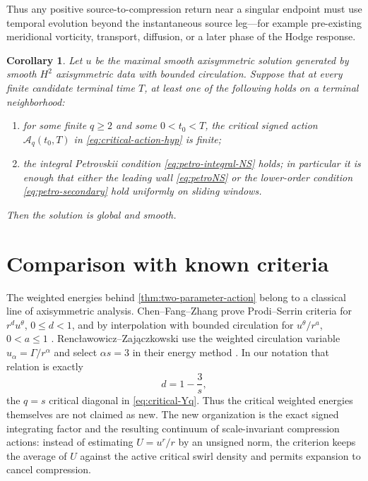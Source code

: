 \documentclass[11pt]{article}
\numberwithin{equation}{section}
\newtheorem{corollary}[corollary]{Corollary}
\theoremstyle{definition}
\begin{document}
Thus any positive source-to-compression return near a singular endpoint must use temporal evolution beyond the instantaneous source leg---for example pre-existing meridional vorticity, transport, diffusion, or a later phase of the Hodge response.

\begin{corollary}\label{cor:conditional-global}
Let $u$ be the maximal smooth axisymmetric solution generated by smooth $H^2$ axisymmetric data with bounded circulation.  Suppose that at every finite candidate terminal time $T$, at least one of the following holds on a terminal neighborhood:
\begin{enumerate}[label=\rm(\alph*)]
\item for some finite $q\ge2$ and some $0<t_0<T$, the critical signed action $\mathcal A_q(t_0,T)$ in \eqref{eq:critical-action-hyp} is finite;
\item the integral Petrovskii condition \eqref{eq:petro-integral-NS} holds; in particular it is enough that either the leading wall \eqref{eq:petroNS} or the lower-order condition \eqref{eq:petro-secondary} hold uniformly on sliding windows.
\end{enumerate}
Then the solution is global and smooth.
\end{corollary}

\section{Comparison with known criteria}

The weighted energies behind \cref{thm:two-parameter-action} belong to a classical line of axisymmetric analysis.  Chen--Fang--Zhang prove Prodi--Serrin criteria for $r^d u^\theta$, $0\le d<1$, and by interpolation with bounded circulation for $u^\theta/r^a$, $0<a\le1$ \cite{ChenFangZhang2017}.  Renc\l awowicz--Zaj\k aczkowski use the weighted circulation variable $u_\alpha=\Gamma/r^\alpha$ and select $\alpha s=3$ in their energy method \cite{RenclawowiczZajaczkowski2019}.  In our notation that relation is exactly
\[
 d=1-\frac3s,
\]
the $q=s$ critical diagonal in \eqref{eq:critical-Yq}.  Thus the critical weighted energies themselves are not claimed as new.  The new organization is the exact signed integrating factor and the resulting continuum of scale-invariant compression actions: instead of estimating $U=u^r/r$ by an unsigned norm, the criterion keeps the average of $U$ against the active critical swirl density and permits expansion to cancel compression.
\end{document}
